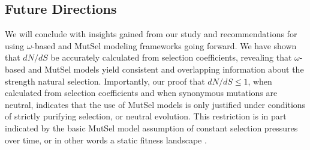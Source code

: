 \documentclass{pnastwo}
\begin{document}
\begin{article}



\section*{Future Directions}
		
We will conclude with insights gained from our study and recommendations for using $\omega$-based and MutSel modeling frameworks going forward. We have shown that $dN/dS$ be accurately calculated from selection coefficients, revealing that $\omega$-based and MutSel models yield consistent and overlapping information about the strength natural selection. Importantly, our proof that $dN/dS \leq 1$, when calculated from selection coefficients and when synonymous mutations are neutral, indicates that the use of MutSel models is only justified under conditions of strictly purifying selection, or neutral evolution. This restriction is in part indicated by the basic MutSel model assumption of constant selection pressures over time, or in other words a static fitness landscape \cite{HalpernBruno1998,Thorneetal2007,Rodrigue2010,Thorne2012}. 


\end{article}
\end{document}
